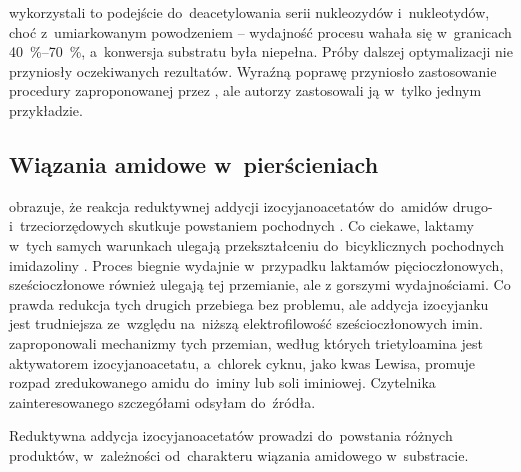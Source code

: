 \citeauthor{ferrari15} wykorzystali to podejście do~deacetylowania serii nukleozydów i~nukleotydów,
  choć z~umiarkowanym powodzeniem \--- wydajność procesu wahała się w~granicach
  \SIrange{40}{70}{\percent}, a~konwersja substratu była niepełna.
Próby dalszej optymalizacji nie przyniosły oczekiwanych rezultatów.
Wyraźną poprawę przyniosło zastosowanie procedury \insitu{} zaproponowanej przez
  \citeauthor{zhao14}, ale autorzy zastosowali ją w~tylko jednym przykładzie.


\subsection{Wiązania amidowe w~pierścieniach}\label{literature:schwartz:rings}
 obrazuje, że reakcja reduktywnej addycji izocyjanoacetatów
   do~amidów drugo-  i~trzeciorzędowych
   skutkuje powstaniem pochodnych 
  .
Co ciekawe,  laktamy  w~tych samych warunkach ulegają
  przekształceniu do~bicyklicznych pochodnych imidazoliny .
Proces biegnie wydajnie w~przypadku laktamów pięcioczłonowych, sześcioczłonowe również ulegają
  tej przemianie, ale z gorszymi wydajnościami.
Co prawda redukcja tych drugich przebiega bez problemu, ale addycja izocyjanku jest trudniejsza
  ze~względu na~niższą elektrofilowość sześcioczłonowych imin.
\citeauthor{zheng17} zaproponowali mechanizmy tych przemian, według których trietyloamina
  jest aktywatorem izocyjanoacetatu, a~chlorek cyknu, jako kwas Lewisa, promuje rozpad
  zredukowanego amidu do~iminy lub soli iminiowej.
Czytelnika zainteresowanego szczegółami odsyłam do~źródła.
\begin{marginscheme}[-27\baselineskip]
  
  \caption{
    Reduktywna addycja izocyjanoacetatów prowadzi do~powstania różnych produktów,
      w~zależności od~charakteru wiązania amidowego w~substracie.
  }
  \label{sch:zr-ncac-add}
\end{marginscheme}

